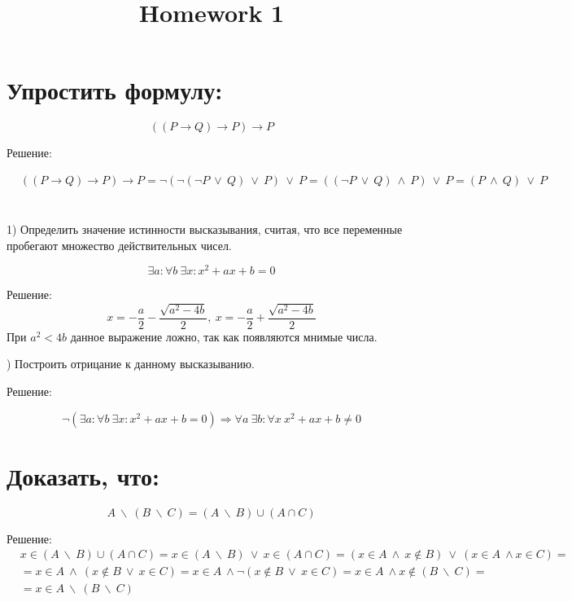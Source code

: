 \documentclass[a4paper, fontsize=10pt]{article}
\title{Homework 1}
\date{}
\begin{document}
    \maketitle

    \section{\normalsize \normalfont Упростить формулу:}
    $$((P \longrightarrow Q) \longrightarrow P) \longrightarrow P$$

    Решение:

    \begin{align*}
        &((P \longrightarrow Q) \longrightarrow P) \longrightarrow P = \lnot(\lnot(\lnot P \ \vee \ Q) 
        \ \vee \ P) \ \vee \ P = ((\lnot P \ \vee \ Q) \ \wedge \ P) \ \vee \ P =(P \ \wedge \ Q) \ \vee \ P  
    \end{align*}


    \section{}

    1) Определить значение истинности высказывания, считая, что все переменные
    пробегают множество действительных чисел.

    $$\exists a : \forall b \  \exists x : x^2 + ax + b = 0$$ \smallskip

    Решение:
    $$x = - \frac{a}{2} - \frac{\sqrt{a^{2} - 4 b}}{2}, \  x = - \frac{a}{2} + \frac{\sqrt{a^{2} - 4 b}}{2}$$\smallskip
    При $a^2 < 4b$ данное выражение ложно, так как появляются мнимые числа.

    \smallskip
    ) Построить отрицание к данному высказыванию. \bigskip

    Решение:

    $$\lnot (\exists a : \forall b \  \exists x : x^2 + ax + b = 0) \Longrightarrow \forall
    a \ \exists b : \forall x \ x^2 + ax + b \neq 0$$

    
    \section{\normalsize \normalfont Доказать, что:}
    $$A \  \backslash \  (B \ \backslash \  C) = (A \ \backslash \ B) \cup (A \cap C)$$

    Решение:
    \begin{align*}
        &x \in (A \ \backslash \ B) \cup (A \cap C) = x \in (A \ \backslash \ B) \ \vee \ x \in (A \cap C) =
        (x \in A \ \wedge \ x \notin B) \ \vee \ (x \in A \ \wedge x \in C) =\\ &= x \in A \  \wedge \ (x \notin B \
        \vee \ x \in C) = x \in A \ \wedge \lnot  (x \notin B \ \vee \ x \in C) = x \in A \ \wedge x \notin
        (B \ \backslash \ C) = \\ &=x \in A \ \backslash \ (B \ \backslash \ C)
    \end{align*}
\end{document}
